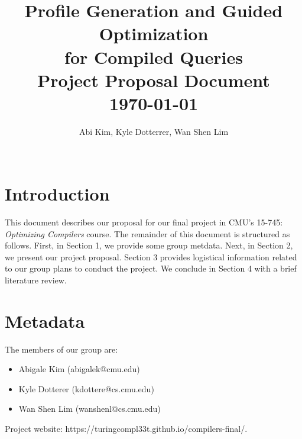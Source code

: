 \documentclass{vldb}
\newcommand{\paperTitle}{Profile Generation and Guided Optimization\\ for Compiled Queries\\ 
    \large Project Proposal Document\\
    \today}
\begin{document}
\title{\paperTitle}

\author{
    \alignauthor Abi Kim, Kyle Dotterrer, Wan Shen Lim\\
    \\
}

\makeatletter
\def\@copyrightspace{\relax}
\makeatother

\maketitle


\section{Introduction}

This document describes our proposal for our final project in CMU's 15-745: \textit{Optimizing Compilers} course. The remainder of this document is structured as follows. First, in Section 1, we provide some group metdata. Next, in Section 2, we present our project proposal. Section 3 provides logistical information related to our group plans to conduct the project. We conclude in Section 4 with a brief literature review.


\section{Metadata}

The members of our group are:

\begin{itemize}
    \item Abigale Kim (abigalek@cmu.edu)
    \item Kyle Dotterer (kdottere@cs.cmu.edu)
    \item Wan Shen Lim (wanshenl@cs.cmu.edu)
\end{itemize}

Project website: https://turingcompl33t.github.io/compilers-final/.

\end{document}
